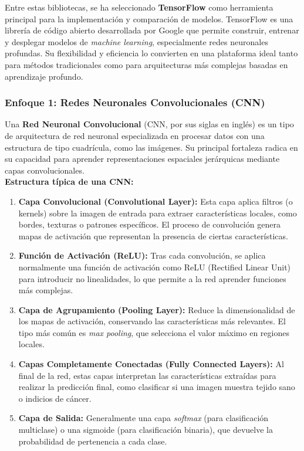 \documentclass[12pt]{article} %
\begin{document}
Entre estas bibliotecas, se ha seleccionado \textbf{TensorFlow} como herramienta principal para la implementación y comparación de modelos. TensorFlow es una librería de código abierto desarrollada por Google que permite construir, entrenar y desplegar modelos de \textit{machine learning}, especialmente redes neuronales profundas. Su flexibilidad y eficiencia lo convierten en una plataforma ideal tanto para métodos tradicionales como para arquitecturas más complejas basadas en aprendizaje profundo.\\

\subsubsection{Enfoque 1: Redes Neuronales Convolucionales (CNN)}
Una \textbf{Red Neuronal Convolucional} (CNN, por sus siglas en inglés) es un tipo de arquitectura de red neuronal especializada en procesar datos con una estructura de tipo cuadrícula, como las imágenes. Su principal fortaleza radica en su capacidad para aprender representaciones espaciales jerárquicas mediante capas convolucionales.\\

\textbf{Estructura típica de una CNN:}
\begin{enumerate}
    \item \textbf{Capa Convolucional (Convolutional Layer):} Esta capa aplica filtros (o kernels) sobre la imagen de entrada para extraer características locales, como bordes, texturas o patrones específicos. El proceso de convolución genera mapas de activación que representan la presencia de ciertas características.
    \item \textbf{Función de Activación (ReLU):} Tras cada convolución, se aplica normalmente una función de activación como ReLU (Rectified Linear Unit) para introducir no linealidades, lo que permite a la red aprender funciones más complejas.
    \item \textbf{Capa de Agrupamiento (Pooling Layer):} Reduce la dimensionalidad de los mapas de activación, conservando las características más relevantes. El tipo más común es \textit{max pooling}, que selecciona el valor máximo en regiones locales.
    \item \textbf{Capas Completamente Conectadas (Fully Connected Layers):} Al final de la red, estas capas interpretan las características extraídas para realizar la predicción final, como clasificar si una imagen muestra tejido sano o indicios de cáncer.
    \item \textbf{Capa de Salida:} Generalmente una capa \textit{softmax} (para clasificación multiclase) o una sigmoide (para clasificación binaria), que devuelve la probabilidad de pertenencia a cada clase.

\end{enumerate}
\end{document}
